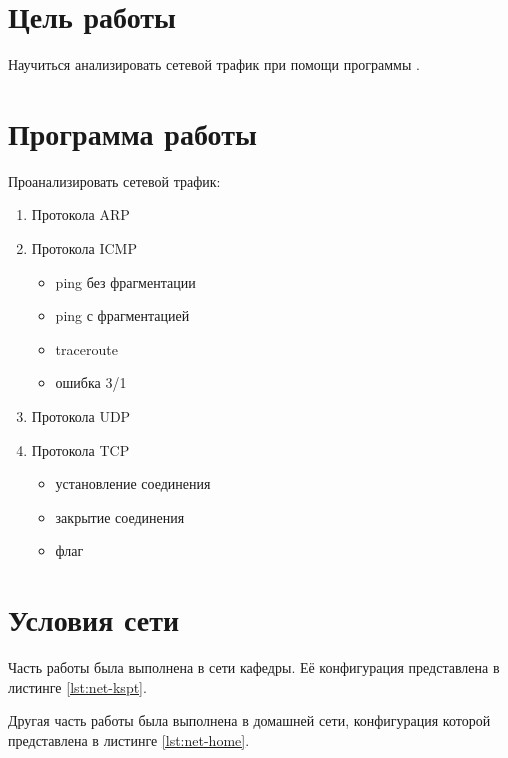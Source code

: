 





\tableofcontents
\listoffigures
\lstlistoflistings
\newpage

\section{Цель работы}

Научиться анализировать сетевой трафик при помощи программы .

\section{Программа работы}

Проанализировать сетевой трафик:

\begin{enumerate}
	\item Протокола ARP
	\item Протокола ICMP
	\begin{itemize}
		\item ping без фрагментации
		\item ping с фрагментацией
		\item traceroute
		\item ошибка 3/1
	\end{itemize}
	\item Протокола UDP
	\item Протокола TCP
	\begin{itemize}
		\item установление соединения
		\item закрытие соединения
		\item флаг 
	\end{itemize}
\end{enumerate}

\section{Условия сети}

Часть работы была выполнена в сети кафедры. Её конфигурация представлена в листинге \ref{lst:net-kspt}.




Другая часть работы была выполнена в домашней сети, конфигурация которой представлена в листинге \ref{lst:net-home}.

